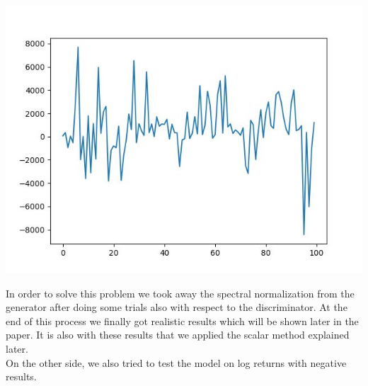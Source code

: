 \documentclass{article}
\begin{document}
\begin{multicols}{2}
\begin{center}
        \includegraphics[scale = 0.2]{imgs/elisa/4.jpg}
    \end{center}

    In order to solve this problem we took away the spectral normalization from the generator after doing some trials also with respect to the discriminator. At the end of this process we finally got realistic results which will be shown later in the paper. It is also with these results that we applied the scalar method explained later. \\

    On the other side, we also tried to test the model on log returns with negative results.\\


\end{multicols}
\end{document}
